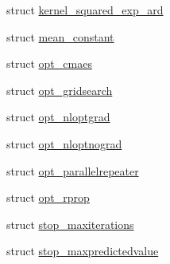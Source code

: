 \begin{DoxyCompactItemize}
\item 
struct \hyperlink{structlimbo_1_1defaults_1_1kernel__squared__exp__ard}{kernel\+\_\+squared\+\_\+exp\+\_\+ard}
\item 
struct \hyperlink{structlimbo_1_1defaults_1_1mean__constant}{mean\+\_\+constant}
\item 
struct \hyperlink{structlimbo_1_1defaults_1_1opt__cmaes}{opt\+\_\+cmaes}
\item 
struct \hyperlink{structlimbo_1_1defaults_1_1opt__gridsearch}{opt\+\_\+gridsearch}
\item 
struct \hyperlink{structlimbo_1_1defaults_1_1opt__nloptgrad}{opt\+\_\+nloptgrad}
\item 
struct \hyperlink{structlimbo_1_1defaults_1_1opt__nloptnograd}{opt\+\_\+nloptnograd}
\item 
struct \hyperlink{structlimbo_1_1defaults_1_1opt__parallelrepeater}{opt\+\_\+parallelrepeater}
\item 
struct \hyperlink{structlimbo_1_1defaults_1_1opt__rprop}{opt\+\_\+rprop}
\item 
struct \hyperlink{structlimbo_1_1defaults_1_1stop__maxiterations}{stop\+\_\+maxiterations}
\item 
struct \hyperlink{structlimbo_1_1defaults_1_1stop__maxpredictedvalue}{stop\+\_\+maxpredictedvalue}
\end{DoxyCompactItemize}
